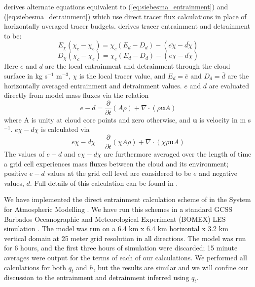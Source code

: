 \documentclass[draft,grl]{agutex}
\begin{document}
\begin{article}
\cite{Romps2010} derives alternate equations equivalent to 
(\ref{eq:siebesma_entrainment}) and (\ref{eq:siebesma_detrainment}) which use
direct tracer flux calculations in place of horizontally averaged tracer 
budgets.  \cite{Romps2010} derives tracer entrainment and detrainment to be:
\begin{equation}
  \label{eq:romps_entrainment}
  E_{\chi}(\chi_{c} - \chi_{e}) = \chi_{c}(E_d-D_d) 
                                - (\overline{e\chi} - \overline{d\chi})
\end{equation}
\begin{equation}
  \label{eq:romps_detrainment}
  D_{\chi}(\chi_{c} - \chi_{e}) = \chi_{e}(E_d-D_d) 
                                - (\overline{e\chi} - \overline{d\chi})
\end{equation}
Here $e$ and $d$ are the local entrainment and detrainment through the cloud 
surface in kg s$^{-1}$ m$^{-3}$, $\chi$ is the local tracer value, and
$E_d = \overline{e}$ and $D_d = \overline{d}$ are the horizontally averaged 
entrainment and detrainment values.  $e$ and $d$ are evaluated directly from 
model mass fluxes via the relation
\begin{equation}
  \label{eq:romps_e_minus_d}
  e - d = \frac{\partial}{\partial t}(A\rho) 
        + \nabla \cdot (\rho \mathbf{u} A) 
\end{equation}
where A is unity at cloud core points and zero otherwise, and $\mathbf{u}$ is 
velocity in m s$^{-1}$.  $e\chi - d\chi$ is calculated via 
\begin{equation}
  \label{eq:romps_echi_minus_dchi}
  e\chi - d\chi = \frac{\partial}{\partial t}(\chi A \rho) 
                + \nabla \cdot (\chi \rho \mathbf{u} A) 
\end{equation}
The values of $e - d$ and $e\chi - d\chi$ are furthermore averaged over the 
length of time a grid cell experiences mass fluxes between the cloud and its 
environment; positive $e-d$ values at the grid cell level are considered to 
be $e$ and negative values, $d$.  Full details of this calculation can be 
found in \cite{Romps2010}.

We have implemented the direct entrainment calculation scheme of 
\cite{Romps2010} in the System for Atmospheric Modelling 
\citep[SAM;][]{Khairoutdinov2003}.  We have run this schemes in a standard 
GCSS Barbados Oceanographic and Meteorological Experiment (BOMEX) LES 
simulation \citep{Holland1973, Siebesma2003}.  The model was run on a 6.4 km 
x 6.4 km horizontal x 3.2 km vertical domain at 25 meter grid resolution in 
all directions.  The model was run for 6 hours, and the first three hours 
of simulation were discarded; 15 minute averages were output for the terms 
of each of our calculations.  We performed all calculations for both $q_t$ 
and $h$, but the results are similar and we will confine our discussion to 
the entrainment and detrainment inferred using $q_t$.  


\end{article}
\end{document}

